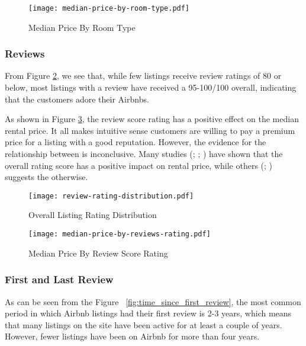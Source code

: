 \begin{figure}[!htbp]
        \centering
        \texttt{[image: median-price-by-room-type.pdf]}
        \caption{Median Price By Room Type}
        \label{fig:room_type_price}
\end{figure}

\subsubsection*{Reviews}

From Figure   \ref{fig:overall-listing}, we see that, while few listings receive
review ratings of 80 or below, most listings with a review have received a
95-100/100 overall,  indicating that the customers adore their Airbnbs.


As shown in Figure \ref{fig:price_by_review_score_rating}, the review score
rating has a positive effect on the median rental price. It all makes intuitive
sense customers are willing to pay a premium price for a listing with a good
reputation.  However, the evidence for the relationship between is inconclusive.
Many studies (\cite{chen2017consumer}; \cite{gibbs2018use};
\cite{wang2017price}) have shown that the overall rating score has a positive
impact on rental price, while others (\cite{li2016pros}; \cite{zhang2017key})
suggests the otherwise.

\begin{figure}[!htbp]\centering
    \texttt{[image: review-rating-distribution.pdf]}
    \caption{Overall Listing Rating Distribution}
    \label{fig:overall-listing}
\end{figure}

\begin{figure}[!htbp]\centering
    \texttt{[image: median-price-by-reviews-rating.pdf]}
    \caption{Median Price By Review Score Rating}
    \label{fig:price_by_review_score_rating}
\end{figure}

\subsubsection*{First and Last Review}

As can be seen from the Figure ~\ref{fig:time_since_first_review}, the most
common period in which  Airbnb listings had their first review is 2-3 years,
which means that many listings on the site have been active for at least a
couple of years. However,  fewer listings have been on Airbnb for more than four
years.

